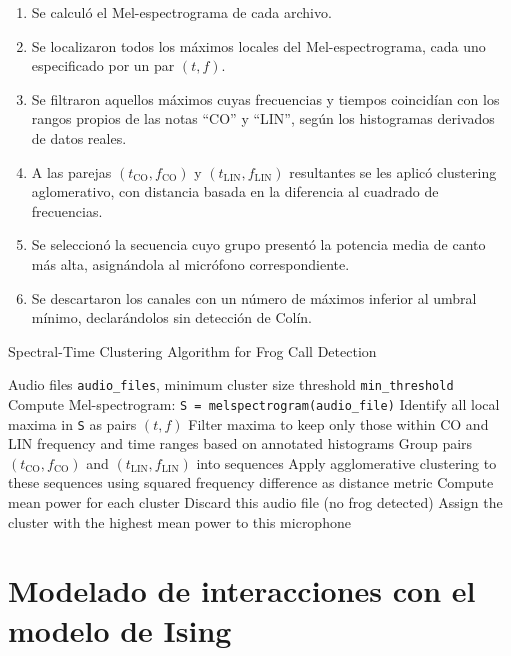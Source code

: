 \begin{enumerate}
  \item Se calculó el Mel-espectrograma de cada archivo.
  \item Se localizaron todos los máximos locales del Mel-espectrograma, cada uno especificado por un par \((t,f)\).
  \item Se filtraron aquellos máximos cuyas frecuencias y tiempos coincidían con los rangos propios de las notas “CO” y “LIN”, según los histogramas derivados de datos reales.
  \item A las parejas \((t_{\mathrm{CO}},f_{\mathrm{CO}})\) y \((t_{\mathrm{LIN}},f_{\mathrm{LIN}})\) resultantes se les aplicó clustering aglomerativo, con distancia basada en la diferencia al cuadrado de frecuencias.
  \item Se seleccionó la secuencia cuyo grupo presentó la potencia media de canto más alta, asignándola al micrófono correspondiente.
  \item Se descartaron los canales con un número de máximos inferior al umbral mínimo, declarándolos sin detección de Colín.
\end{enumerate}


\begin{algorithm}[H]
\caption{Spectral-Time Clustering Algorithm for Frog Call Detection}
\begin{algorithmic}[1]
\Require Audio files \texttt{audio\_files}, minimum cluster size threshold \texttt{min\_threshold}
    \State Compute Mel-spectrogram: \texttt{S = melspectrogram(audio\_file)}
    \State Identify all local maxima in \texttt{S} as pairs $(t, f)$
    \State Filter maxima to keep only those within CO and LIN frequency and time ranges based on annotated histograms
    \State Group pairs $(t_{\text{CO}}, f_{\text{CO}})$ and $(t_{\text{LIN}}, f_{\text{LIN}})$ into sequences
    \State Apply agglomerative clustering to these sequences using squared frequency difference as distance metric
    \State Compute mean power for each cluster
        \State Discard this audio file (no frog detected)
    \Else
        \State Assign the cluster with the highest mean power to this microphone
    \EndIf
\EndFor
\end{algorithmic}
\end{algorithm}



\section{Modelado de interacciones con el modelo de Ising}
\label{sec:modelado_ising}



